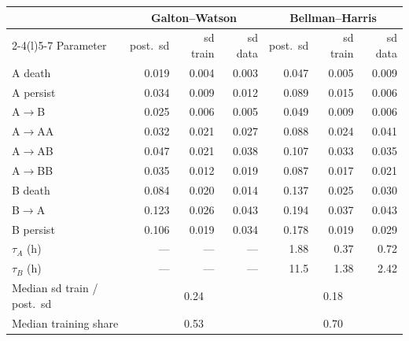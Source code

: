 \documentclass[10pt,a4paper]{article}
\newcommand{\tA}{$\tau_A$}
\newcommand{\tB}{$\tau_B$}
\newcommand{\blk}[1]{\par\needspace{5\baselineskip}\smallskip{\sffamily\bfseries\color{inkgray}#1}\par}
\newcommand{\Comment}{\blk{Comment}}
\renewcommand{\blk}[1]{\par\Needspace*{5\baselineskip}\smallskip{\sffamily\bfseries\color{inkgray}#1}\par}
\begin{document}
\begin{center}\footnotesize
\begin{tabular}{@{}lrrrrrr@{}}\toprule
 & \multicolumn{3}{c}{Galton--Watson} & \multicolumn{3}{c}{Bellman--Harris} \\\cmidrule(lr){2-4}\cmidrule(l){5-7}
Parameter & post.\ sd & sd train & sd data & post.\ sd & sd train & sd data \\\midrule
A death & 0.019 & 0.004 & 0.003 & 0.047 & 0.005 & 0.009 \\
A persist & 0.034 & 0.009 & 0.012 & 0.089 & 0.015 & 0.006 \\
A$\to$B & 0.025 & 0.006 & 0.005 & 0.049 & 0.009 & 0.006 \\
A$\to$AA & 0.032 & 0.021 & 0.027 & 0.088 & 0.024 & 0.041 \\
A$\to$AB & 0.047 & 0.021 & 0.038 & 0.107 & 0.033 & 0.035 \\
A$\to$BB & 0.035 & 0.012 & 0.019 & 0.087 & 0.017 & 0.021 \\
B death & 0.084 & 0.020 & 0.014 & 0.137 & 0.025 & 0.030 \\
B$\to$A & 0.123 & 0.026 & 0.043 & 0.194 & 0.037 & 0.043 \\
B persist & 0.106 & 0.019 & 0.034 & 0.178 & 0.019 & 0.029 \\
\tA{} (h) & --- & --- & --- & 1.88 & 0.37 & 0.72 \\
\tB{} (h) & --- & --- & --- & 11.5 & 1.38 & 2.42 \\\midrule
Median sd train / post.\ sd & \multicolumn{3}{c}{0.24} & \multicolumn{3}{c}{0.18} \\
Median training share & \multicolumn{3}{c}{0.53} & \multicolumn{3}{c}{0.70} \\\bottomrule
\end{tabular}
\end{center}
\Comment
\end{document}
